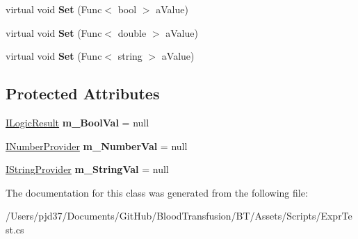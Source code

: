 \begin{DoxyCompactItemize}
\item 
virtual void {\bfseries Set} (Func$<$ bool $>$ a\+Value)\hypertarget{class_b83_1_1_logic_expression_parser_1_1_value_provider_a594ecc6c83a9522b6d97ffacd06e923b}{}\label{class_b83_1_1_logic_expression_parser_1_1_value_provider_a594ecc6c83a9522b6d97ffacd06e923b}

\item 
virtual void {\bfseries Set} (Func$<$ double $>$ a\+Value)\hypertarget{class_b83_1_1_logic_expression_parser_1_1_value_provider_a4c622af5b7e938d4488aceb931d439ef}{}\label{class_b83_1_1_logic_expression_parser_1_1_value_provider_a4c622af5b7e938d4488aceb931d439ef}

\item 
virtual void {\bfseries Set} (Func$<$ string $>$ a\+Value)\hypertarget{class_b83_1_1_logic_expression_parser_1_1_value_provider_aa278214afcdb61fc3f93473edb6af570}{}\label{class_b83_1_1_logic_expression_parser_1_1_value_provider_aa278214afcdb61fc3f93473edb6af570}

\end{DoxyCompactItemize}
\subsection*{Protected Attributes}
\begin{DoxyCompactItemize}
\item 
\hyperlink{interface_b83_1_1_logic_expression_parser_1_1_i_logic_result}{I\+Logic\+Result} {\bfseries m\+\_\+\+Bool\+Val} = null\hypertarget{class_b83_1_1_logic_expression_parser_1_1_value_provider_af2882640e7ccd7cf63838cafdd3d5fff}{}\label{class_b83_1_1_logic_expression_parser_1_1_value_provider_af2882640e7ccd7cf63838cafdd3d5fff}

\item 
\hyperlink{interface_b83_1_1_logic_expression_parser_1_1_i_number_provider}{I\+Number\+Provider} {\bfseries m\+\_\+\+Number\+Val} = null\hypertarget{class_b83_1_1_logic_expression_parser_1_1_value_provider_a8c30a79a1b0885e5c199bf0c5d5fd66b}{}\label{class_b83_1_1_logic_expression_parser_1_1_value_provider_a8c30a79a1b0885e5c199bf0c5d5fd66b}

\item 
\hyperlink{interface_b83_1_1_logic_expression_parser_1_1_i_string_provider}{I\+String\+Provider} {\bfseries m\+\_\+\+String\+Val} = null\hypertarget{class_b83_1_1_logic_expression_parser_1_1_value_provider_a9054c7ba6a6485303b76ef16a03617c6}{}\label{class_b83_1_1_logic_expression_parser_1_1_value_provider_a9054c7ba6a6485303b76ef16a03617c6}

\end{DoxyCompactItemize}


The documentation for this class was generated from the following file\+:\begin{DoxyCompactItemize}
\item 
/\+Users/pjd37/\+Documents/\+Git\+Hub/\+Blood\+Transfusion/\+B\+T/\+Assets/\+Scripts/Expr\+Test.\+cs\end{DoxyCompactItemize}
